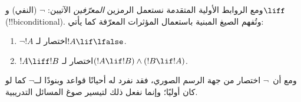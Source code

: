 \documentclass[../../../include/open-logic-section]{subfiles}
\begin{document}
ومع الروابط الأولية المتقدمة نستعمل الرمزين
\emph{المعرّفين} الآتيين: $\lnot$ (النفي) و$\liff$
(!!{biconditional}). وتُفهم الصيغ المبنية باستعمال المؤثرات المعرّفة
كما يأتي:
\begin{enumerate}
\item $\lnot !A$ اختصار لـ$!A \lif \lfalse$.

\item $!A \liff !B$ اختصار لـ$(!A \lif !B) \land (!B
  \lif !A)$.
\end{enumerate}

ومع أن~$\lnot$ اختصار من جهة الرسم الصوري، فقد نفرد له أحيانًا قواعد
وبنودًا لــ$\lnot$ كما لو كان أوليًا؛ وإنما نفعل ذلك لتيسير صوغ المسائل
التدريبية.
\end{document}
